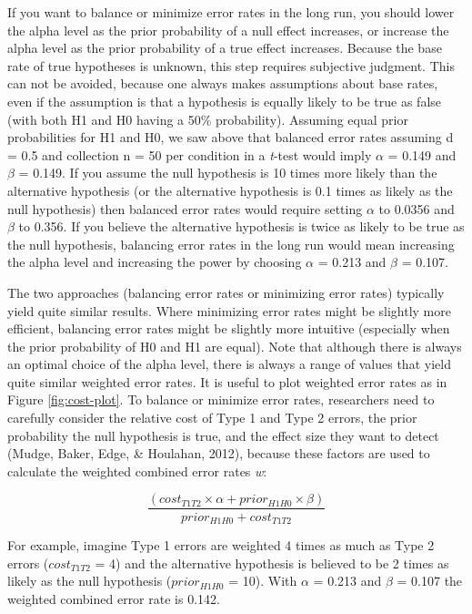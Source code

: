 \documentclass[
  english,
  ,jou,floatsintext]{apa6}
\begin{document}
If you want to balance or minimize error rates in the long run, you should lower the alpha level as the prior probability of a null effect increases, or increase the alpha level as the prior probability of a true effect increases. Because the base rate of true hypotheses is unknown, this step requires subjective judgment. This can not be avoided, because one always makes assumptions about base rates, even if the assumption is that a hypothesis is equally likely to be true as false (with both H1 and H0 having a 50\% probability). Assuming equal prior probabilities for H1 and H0, we saw above that balanced error rates assuming d = 0.5 and collection n = 50 per condition in a \emph{t}-test would imply \(\alpha\) = 0.149 and \(\beta\) = 0.149. If you assume the null hypothesis is 10 times more likely than the alternative hypothesis (or the alternative hypothesis is 0.1 times as likely as the null hypothesis) then balanced error rates would require setting \(\alpha\) to 0.0356 and \(\beta\) to 0.356. If you believe the alternative hypothesis is twice as likely to be true as the null hypothesis, balancing error rates in the long run would mean increasing the alpha level and increasing the power by choosing \(\alpha\) = 0.213 and \(\beta\) = 0.107.

The two approaches (balancing error rates or minimizing error rates) typically yield quite similar results. Where minimizing error rates might be slightly more efficient, balancing error rates might be slightly more intuitive (especially when the prior probability of H0 and H1 are equal). Note that although there is always an optimal choice of the alpha level, there is always a range of values that yield quite similar weighted error rates. It is useful to plot weighted error rates as in Figure \ref{fig:cost-plot}. To balance or minimize error rates, researchers need to carefully consider the relative cost of Type 1 and Type 2 errors, the prior probability the null hypothesis is true, and the effect size they want to detect (Mudge, Baker, Edge, \& Houlahan, 2012), because these factors are used to calculate the weighted combined error rates \emph{w}:

\begin{equation}
\frac{(cost_{T1T2} \times \alpha + prior_{H1H0} \times \beta)}{prior_{H1H0}+cost_{T1T2}}
\label{eq:minimize}
\end{equation}

For example, imagine Type 1 errors are weighted 4 times as much as Type 2 errors (\(cost_{T1T2}\) = 4) and the alternative hypothesis is believed to be 2 times as likely as the null hypothesis (\(prior_{H1H0}\) = 10). With \(\alpha\) = 0.213 and \(\beta\) = 0.107 the weighted combined error rate is 0.142.
\end{document}
